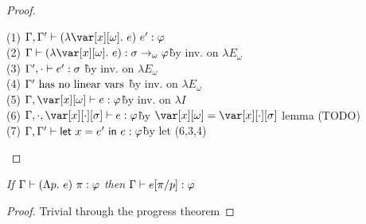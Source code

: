 \begin{proof}~

\begin{tabbing}
    (1) $\G,\G' \vdash (\lambda \xo.~e)~e' : \vp$\\
    (2) $\G \vdash (\lambda \xo.~e) : \s \to_\omega \vp$\` by inv. on $\lambda E_\omega$\\
    (3) $\Gamma', \cdot \vdash e' : \sigma$ \` by inv. on $\lambda E_\omega$\\
    (4) $\Gamma' ~\textrm{has no linear vars}$ \` by inv. on $\lambda E_\omega$\\
    (5) $\G,\xo \vdash e : \vp$\` by inv. on $\lambda I$\\
    (6) $\G, \cdot, \x[\cdot][\s] \vdash e : \vp$\` by $\xo = \x[\cdot][\s]$ lemma (TODO)\\
    (7) $\Gamma,\Gamma' \vdash \mathsf{let}~x = e'~\mathsf{in}~e : \varphi$\` by let (6,3,4)\\
\end{tabbing}
\end{proof}


\begin{lemma}
    \emph{If $\Gamma \vdash (\Lambda p.~e)~\pi : \varphi$ then $\Gamma \vdash e[\pi/p] : \varphi$}
\end{lemma}

\begin{proof}
    Trivial through the progress theorem
\end{proof}


